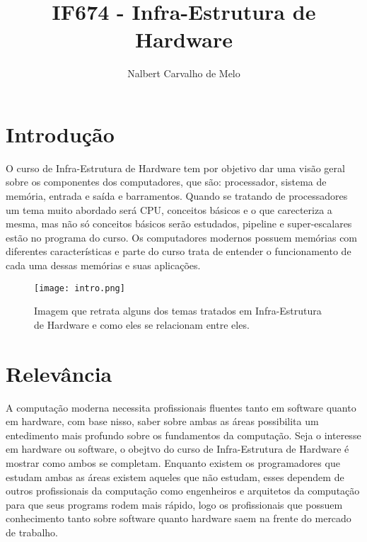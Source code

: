 \documentclass{article}
\begin{document}
\title{IF674 - Infra-Estrutura de Hardware}
\maketitle
\author{Nalbert Carvalho de Melo}
\section{Introdução}
O curso de Infra-Estrutura de Hardware tem por objetivo dar uma visão geral sobre os componentes dos computadores, que são:  processador, sistema de memória, entrada e saída e barramentos. Quando se tratando de processadores um tema muito abordado será CPU, conceitos básicos e o que carecteriza a mesma, mas não só conceitos básicos serão estudados, pipeline e super-escalares estão no programa do curso. Os computadores modernos possuem memórias com diferentes características e parte do curso trata de entender o funcionamento de cada uma dessas memórias e suas aplicações\citep{ref1}. 
\begin{figure}[h!]
    \centering
    \texttt{[image: intro.png]}
    \caption{Imagem que retrata alguns dos temas tratados em Infra-Estrutura de Hardware e como eles se relacionam entre eles.}
    \citep{ref5}
    
    \label{fig:imagem}
\end{figure}

\section{Relevância}
A computação moderna necessita profissionais fluentes tanto em software quanto em hardware, com base nisso, saber sobre ambas as áreas possibilita um entedimento mais profundo sobre os fundamentos da computação. Seja o interesse em hardware ou software, o obejtvo do curso de Infra-Estrutura de Hardware é mostrar como ambos se completam. Enquanto existem os programadores que estudam ambas as áreas existem aqueles que não estudam, esses dependem de outros profissionais da computação como engenheiros e arquitetos da computação para que seus programs rodem mais rápido, logo os profissionais que possuem conhecimento tanto sobre software quanto hardware saem na frente do mercado de trabalho\citep{ref2}.
\end{document}
